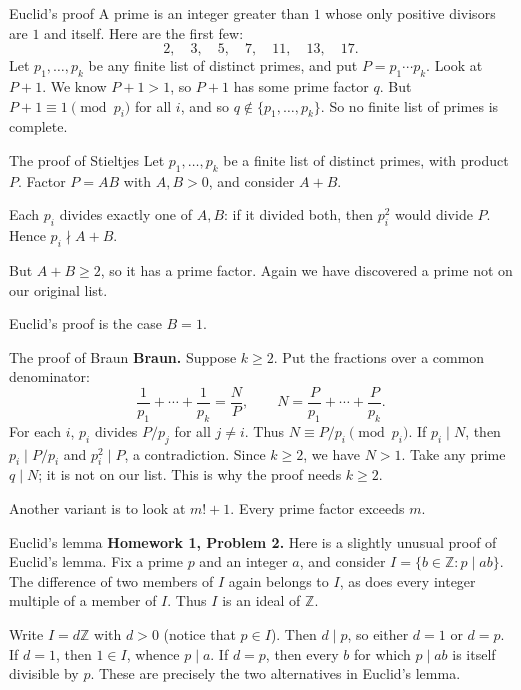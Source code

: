 \documentclass[aspectratio=169,11pt]{beamer}
\newcommand{\Z}{\mathbb Z}
\newcommand{\HW}[2]{{\color{teal}\textbf{Homework #1, Problem #2.}}}
\begin{document}
\begin{frame}{Euclid's proof}
A prime is an integer greater than $1$ whose only positive divisors are $1$ and itself. Here are the first few:
\[2,\quad3,\quad5,\quad7,\quad11,\quad13,\quad17.\]
Let $p_1,\ldots,p_k$ be any finite list of distinct primes, and put $P=p_1\cdots p_k$. Look at $P+1$. We know $P+1>1$, so $P+1$ has some prime factor $q$. But $P+1\equiv1\pmod{p_i}$ for all $i$, and so $q\notin\{p_1,\ldots,p_k\}$. So no finite list of primes is complete.
\end{frame}
\begin{frame}{The proof of Stieltjes}
Let $p_1,\ldots,p_k$ be a finite list of distinct primes, with product $P$. Factor $P=AB$ with $A,B>0$, and consider $A+B$.

Each $p_i$ divides exactly one of $A,B$: if it divided both, then $p_i^2$ would divide $P$. Hence $p_i\nmid A+B$.

But $A+B\ge2$, so it has a prime factor. Again we have discovered a prime not on our original list.

Euclid's proof is the case $B=1$.
\end{frame}
\begin{frame}{The proof of Braun}
\textbf{Braun.} Suppose $k\ge2$. Put the fractions over a common denominator:
\[\frac1{p_1}+\cdots+\frac1{p_k}=\frac NP,\qquad N=\frac P{p_1}+\cdots+\frac P{p_k}.\]
For each $i$, $p_i$ divides $P/p_j$ for all $j\ne i$. Thus $N\equiv P/p_i\pmod{p_i}$. If $p_i\mid N$, then $p_i\mid P/p_i$ and $p_i^2\mid P$, a contradiction. Since $k\ge2$, we have $N>1$. Take any prime $q\mid N$; it is not on our list. This is why the proof needs $k\ge2$.

Another variant is to look at $m!+1$. Every prime factor exceeds $m$.
\end{frame}
\begin{frame}{Euclid's lemma}
\HW{1}{2} Here is a slightly unusual proof of Euclid's lemma. Fix a prime $p$ and an integer $a$, and consider $I=\{b\in\Z:p\mid ab\}$. The difference of two members of $I$ again belongs to $I$, as does every integer multiple of a member of $I$. Thus $I$ is an ideal of $\Z$.

Write $I=d\Z$ with $d>0$ (notice that $p\in I$). Then $d\mid p$, so either $d=1$ or $d=p$. If $d=1$, then $1\in I$, whence $p\mid a$. If $d=p$, then every $b$ for which $p\mid ab$ is itself divisible by $p$. These are precisely the two alternatives in Euclid's lemma.
\end{frame}
\end{document}
